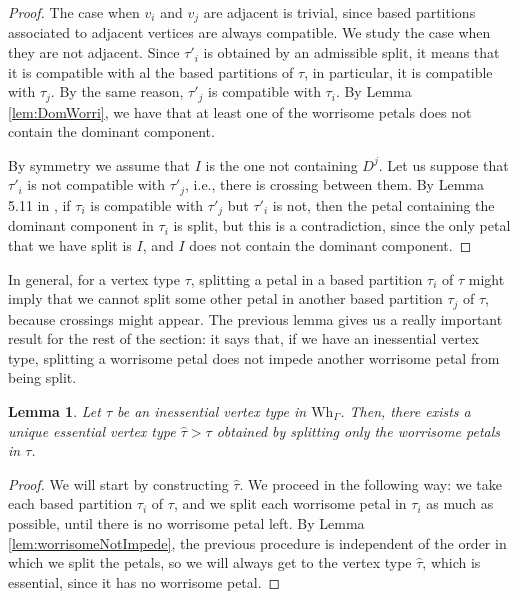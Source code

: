 \documentclass[a4paper]{amsart}
\newcommand{\G}{\Gamma}
\newcommand{\Wh}{\mathrm{Wh}}
\newtheorem{lem}[teo]{Lemma}
\theoremstyle{definition}
\theoremstyle{remark}
\begin{document}
\begin{proof}
    The case when $v_i$ and $v_j$ are adjacent is trivial, since based partitions associated to adjacent vertices are always compatible. We study the case when they are not adjacent. Since $\tau'_i$ is obtained by   an admissible split, it means that it is compatible with al the based partitions of $\tau$, in particular, it is compatible with $\tau_j$. By the same reason, $\tau'_j$ is compatible with $\tau_i$. By Lemma \ref{lem:DomWorri}, we have that at least one of the worrisome petals does not contain the dominant component. 
    
    By symmetry we assume that $I$ is the one not containing $D^j$. Let us suppose that $\tau'_i$ is not compatible with $\tau'_j$, i.e., there is crossing between them.  By Lemma 5.11 in \cite{ArMar}, if $\tau_i$ is compatible with $\tau'_j$ but $\tau'_i$ is not, then the petal containing the dominant component in $\tau_i$ is split, but this is a contradiction, since the only petal that we have split is $I$, and $I$ does not contain the dominant component. 
    
   
\end{proof}

In general, for a vertex type $\tau$, splitting a petal in a based partition $\tau_i$ of $\tau$ might imply that we cannot split some other petal in another based partition $\tau_j$ of $\tau$, because  crossings might appear. The previous lemma gives us a really important result for the rest of the section: it says that, if we have an inessential vertex type, splitting a worrisome petal does not impede another worrisome petal from being split.

\begin{lem}
    Let $\tau$ be an inessential vertex type in $\Wh_\G$. Then, there exists a unique essential vertex type $\widehat{\tau}>\tau$ obtained by splitting only the worrisome petals in $\tau$. \label{lem:essentialMaximum}
\end{lem}

\begin{proof}
    We will start by constructing $\widehat{\tau}$. We proceed in the following way: we take each based partition $\tau_i$ of $\tau$, and we split each worrisome petal in $\tau_i$ as much as possible, until there is no worrisome petal left. By Lemma \ref{lem:worrisomeNotImpede}, the previous procedure is independent of the order in which we split the petals, so we will always get to the vertex type $\widehat{\tau}$, which is essential, since it has no worrisome petal. 
\end{proof}
\end{document}
